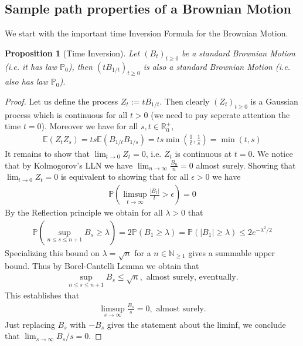 \documentclass[11pt,a4paper, final]{article}
\newtheorem{prop}{Proposition}[section]
\theoremstyle{definition}
\begin{document}
\subsection{Sample path properties of a Brownian Motion}
We start with the important time Inversion Formula for the Brownian Motion.
\begin{prop}[Time Inversion] Let $(B_t)_{t \geq 0}$ be a standard Brownian Motion (i.e. it has law $\mathbb{P}_0$), then $(t B_{1/t})_{t \geq 0}$ is also a standard Brownian Motion (i.e. also has law $\mathbb{P}_0$). 
\end{prop}
\begin{proof}
Let us define the process $Z_t:= t B_{1/t}$. Then clearly $(Z_t)_{t \geq 0}$ is a Gaussian process which is continuous for all $t>0$ (we need to pay seperate attention the time $t=0$). Moreover we have for all $s,t \in \mathbb{R}_0^+$,
\begin{align*}
\mathbb{E}(Z_tZ_s)= ts \mathbb{E}(B_{1/t}B_{1/s}) = ts \min \left( \frac{1}{t}, \frac{1}{s} \right) = \min (t, s ) 
\end{align*}
It remains to show that $\lim_{t \to 0} Z_t=0$, i.e. $Z_t$ is continuous at $t=0$. We notice that by Kolmogorov's LLN we have $\lim_{n \to \infty} \frac{B_n}{n}=0$ almost surely. Showing that $\lim_{t \to 0} Z_t =0$ is equivalent to showing that for all $\epsilon >0$ we have 
\begin{align*}
\mathbb{P}\left( \limsup_{t \to \infty} \frac{|B_t|}{t} > \epsilon \right) =0 
\end{align*}
\newpage
By the Reflection principle we obtain for all $\lambda >0$ that 
\begin{align*}
\mathbb{P}\left( \sup_{n \leq s \leq n+1 }  B_s \geq \lambda \right) = 2 \mathbb{P}( B_1 \geq \lambda) = \mathbb{P}( |B_1| \geq \lambda) \leq 2 e^{- \lambda^2/ 2}
\end{align*}
Specializing this bound on $\lambda= \sqrt{n}$ for a $n \in \mathbb{N}_{\geq 1}$ gives a summable upper bound. Thus by Borel-Cantelli Lemma we obtain that 
\begin{align*}
\sup_{n \leq s \leq n+1} B_s \leq \sqrt{n}, \text{ almost surely, eventually}. 
\end{align*}
This establishes that 
\begin{align*}
\limsup_{s \to \infty} \frac{B_s}{s} = 0, \text{ almost surely}. 
\end{align*}
Just replacing $B_s$ with $-B_s$ gives the statement about the liminf, we conclude that $\lim_{s \to \infty} B_s/s =0. $
\end{proof}
\end{document}
